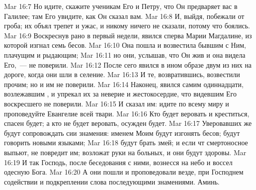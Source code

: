 \vs Mar 16:7 Но идите, скажите ученикам Его и Петру, что Он предваряет вас в Галилее; там Его увидите, как Он сказал вам.
\vs Mar 16:8 И, выйдя, побежали от гроба; их объял трепет и ужас, и никому ничего не сказали, потому что боялись.
\rsbpar\vs Mar 16:9 Воскреснув рано в первый  недели,  явился сперва Марии Магдалине, из которой изгнал семь бесов.
\vs Mar 16:10 Она пошла и возвестила бывшим с Ним, плачущим и рыдающим;
\vs Mar 16:11 но они, услышав, что Он жив и она видела Его,~--- не поверили.
\rsbpar\vs Mar 16:12 После сего явился в ином образе двум из них на дороге, когда они шли в селение.
\vs Mar 16:13 И те, возвратившись, возвестили прочим; но и им не поверили.
\rsbpar\vs Mar 16:14 Наконец, явился самим одиннадцати, возлежавшим , и упрекал их за неверие и жестокосердие, что видевшим Его воскресшего не поверили.
\vs Mar 16:15 И сказал им: идите по всему миру и проповедуйте Евангелие всей твари.
\vs Mar 16:16 Кто будет веровать и креститься, спасен будет; а кто не будет веровать, осужден будет.
\vs Mar 16:17 Уверовавших же будут сопровождать сии знамения: именем Моим будут изгонять бесов; будут говорить новыми языками;
\vs Mar 16:18 будут брать змей; и если чт смертоносное выпьют, не повредит им; возложат руки на больных, и они будут здоровы.
\rsbpar\vs Mar 16:19 И так Господь, после беседования с ними, вознесся на небо и воссел одесную Бога.
\vs Mar 16:20 А они пошли и проповедовали везде, при Господнем содействии и подкреплении слова последующими знамениями. Аминь.
